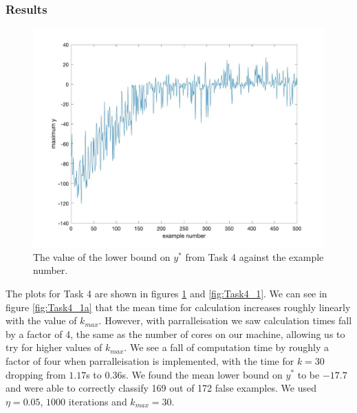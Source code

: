 \documentclass[11pt]{article}
\begin{document}
\subsubsection{Results}
\begin{figure}
    \centering \includegraphics[width=0.5\columnwidth]{Figures/Task4yvexample.jpg}
    \caption{\label{fig:Task4_2}The value of the lower bound on $y^*$ from Task 4 against the example number.}
\end{figure}
The plots for Task 4 are shown in figures \ref{fig:Task4_2} and \ref{fig:Task4_1}.
We can see in figure \ref{fig:Task4_1a} that the mean time for calculation increases roughly linearly with the value of $k_{max}$. 
However, with parralleisation we saw calculation times fall by a factor of 4, the same as the number of cores on our machine, allowing us to try for higher values of $k_{max}$. 
We see a fall of computation time by roughly a factor of four when parralleisation is implemented, with the time for $k=30$ dropping from $1.17$s to $0.36$s.
We found the mean lower bound on $y^*$ to be $-17.7$ and were able to correctly classify 169 out of 172 false examples.
We used $\eta=0.05$, $1000$ iterations and $k_{max}=30$.
\end{document}
